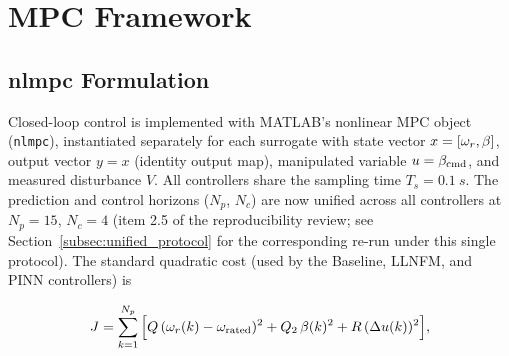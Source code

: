 
\section{MPC Framework}
\label{sec:mpc_framework}

\subsection{nlmpc Formulation}
\label{subsec:nlmpc_formulation}

Closed-loop control is implemented with MATLAB's nonlinear MPC object
(\texttt{nlmpc}), instantiated separately for each surrogate with state
vector $x=[\omega_r,\beta]$, output vector $y=x$ (identity output map),
manipulated variable $u=\beta_{\text{cmd}}$, and measured disturbance $V$. All
controllers share the sampling time $T_s = \SI{0.1}{s}$. The
prediction and control horizons ($N_p$, $N_c$) are now unified across
all controllers at $N_p=15$, $N_c=4$ (item 2.5 of the reproducibility
review; see Section~\ref{subsec:unified_protocol} for the
corresponding re-run under this single protocol). The standard quadratic
cost (used by the Baseline, LLNFM, and PINN controllers) is

\begin{equation}
J = \sum_{k=1}^{N_p} \Big[ Q\,(\omega_r(k)-\omega_{\text{rated}})^2
+ Q_2\,\beta(k)^2 + R\,(\Delta u(k))^2 \Big],
\label{eq:mpc_cost_standard}
\end{equation}

